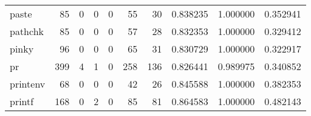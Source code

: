 \begin{longtable}{lrrrrrrrrr}
paste     &                                    85 &                                                  0 &                                                  0 &                                                  0 &                                                 55 &                                                 30 &                                           0.838235 &                               1.000000 &                             0.352941 \\
pathchk   &                                    85 &                                                  0 &                                                  0 &                                                  0 &                                                 57 &                                                 28 &                                           0.832353 &                               1.000000 &                             0.329412 \\
pinky     &                                    96 &                                                  0 &                                                  0 &                                                  0 &                                                 65 &                                                 31 &                                           0.830729 &                               1.000000 &                             0.322917 \\
pr        &                                   399 &                                                  4 &                                                  1 &                                                  0 &                                                258 &                                                136 &                                           0.826441 &                               0.989975 &                             0.340852 \\
printenv  &                                    68 &                                                  0 &                                                  0 &                                                  0 &                                                 42 &                                                 26 &                                           0.845588 &                               1.000000 &                             0.382353 \\
printf    &                                   168 &                                                  0 &                                                  2 &                                                  0 &                                                 85 &                                                 81 &                                           0.864583 &                               1.000000 &                             0.482143 \\

\end{longtable}
